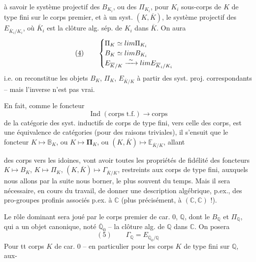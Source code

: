 \documentclass[11pt,a4paper]{article}
\begin{document}
à savoir le système projectif des $B_{K_i}$, ou des $\Pi_{K_i}$, pour $K_i$ sous-corps de $K$ de type fini sur le corps premier, et à un syst. $(K, \overline{K})$, le système projectif des $E_{\overline{K}_i/K_i}$, où $\overline{K}_i$ est la clôture alg. sép. de $K_i$ dans $\overline{K}$. On aura
\[
  (\uncertain{4})\qquad
  \begin{cases}
    \Pi_K \simeq \varprojlim \Pi_{K_i} \\
    B_K \simeq \varprojlim B_{K_i} \\
    E_{\overline{K}/K} \xrightarrow{\ \sim\ } \varprojlim E_{\overline{K}_i/K_i}
  \end{cases}
\]
i.e. on reconstitue les objets $B_K$, $\Pi_K$, $E_{\overline{K}/K}$ à partir des syst. proj. correspondants -- mais l'inverse n'est pas vrai.

En fait, comme le foncteur
\[
  \operatorname{Ind}(\text{corps t.f.}) \longrightarrow \text{corps}
\]
de la catégorie des syst. inductifs de corps de type fini, vers celle des corps, est une équivalence de catégories (pour des raisons triviales), il s'ensuit que le foncteur $K \mapsto \mathbb{B}_K$, ou $K \mapsto \boldsymbol{\Pi}_K$, ou $(K, \overline{K}) \mapsto \mathbb{E}_{\overline{K}/K}$, allant

des corps vers les \ill{} idoines, vont avoir toutes les propriétés de fidélité des foncteurs $K \mapsto B_K$, $K \mapsto \Pi_K$, $(K, \overline{K}) \mapsto \Gamma_{\overline{K}/K}$, restreints aux corps  de type fini, auxquels nous allons par la suite nous borner, le plus souvent du temps. Mais il sera nécessaire, en cours du travail, de donner une description  algébrique, p.ex., des pro-groupes profinis associés p.ex. à $\mathbb{C}$ (plus précisément, à $(\mathbb{C}, \mathbb{C})$ !).

Le rôle dominant sera joué par le corps premier de car. 0, $\mathbb{Q}$, dont le $B_{\mathbb{Q}}$ et $\Pi_{\mathbb{Q}}$, qui a un objet canonique, noté $\overline{\mathbb{Q}}_0$ -- la clôture alg. de $\mathbb{Q}$ dans $\mathbb{C}$. On posera
\[
  (5)\qquad \Gamma_{\mathbb{Q}} = E_{\overline{\mathbb{Q}}_0/\mathbb{Q}}
\]
Pour tt corps $K$ de car. 0 -- en particulier pour les corps $K$ de type fini sur $\mathbb{Q}$, aux-
\end{document}
